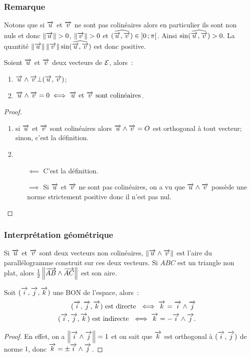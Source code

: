 \subsubsection{Remarque}
Notons que si $\vu$ et $\vv$ ne sont pas colinéaires alors en particulier ils sont non nuls et donc $\norme{\vu}>0$, $\norme{\vv}>0$ et $(\widehat{\vu,\vv})\in \intervalleoo{0}{\pi}$. Ainsi $\sin(\widehat{\vu,\vv})>0$. La quantité $\norme{\vu}\norme{\vv}\sin(\widehat{\vu,\vv})$ est donc positive.
\begin{prop}
  \label{prop:1}
  Soient $\vu$ et $\vv$ deux vecteurs de $\E$, alors~:
  \begin{enumerate}
  \item $\vu \wedge \vv \bot (\vu,\vv)$;
  \item $\vu \wedge \vv = 0 \iff \vu \textrm{ et } \vv \text{ sont colinéaires}$.
  \end{enumerate}
\end{prop}
\begin{proof}
  \begin{enumerate}
  \item si $\vu$ et $\vv$ sont colinéaires alors $\vu \wedge \vv = O$ est orthogonal à tout vecteur; sinon, c'est la définition.
  \item
    \begin{itemize}
    \item[$\impliedby$] C'est la définition.
    \item[$\implies$] Si $\vu$ et $\vv$ ne sont pas colinéaires, on a vu que $\vu \wedge \vv$ possède une norme strictement positive donc il n'est pas nul.\qedhere
    \end{itemize}
  \end{enumerate}
\end{proof}

\subsubsection{Interprétation géométrique}
Si $\vu$ et $\vv$ sont deux vecteurs non colinéaires, $\norme{\vu\wedge\vv}$ est l'aire du parallélogramme construit sur ces deux vecteurs. Si $ABC$ est un triangle non plat, alors $\frac{1}{2}\norme{\vect{AB}\wedge\vect{AC}}$ est son aire.
\begin{prop}
  Soit $\bondtrois$ une BON de l'espace, alors~:
  \begin{align}
    \bondtrois\text{~est directe~}\iff \vk=\vi\wedge\vj\\
    \bondtrois\text{~est indirecte~}\iff \vk=-\vi\wedge\vj.
  \end{align}
\end{prop}
\begin{proof}
  En effet, on a $\norme{\vi\wedge\vj}=1$ et on sait que $\vk$ est orthogonal à $(\vi,\vj)$ de norme $1$, donc $\vk=\pm\vi\wedge\vj$.  
\end{proof}

